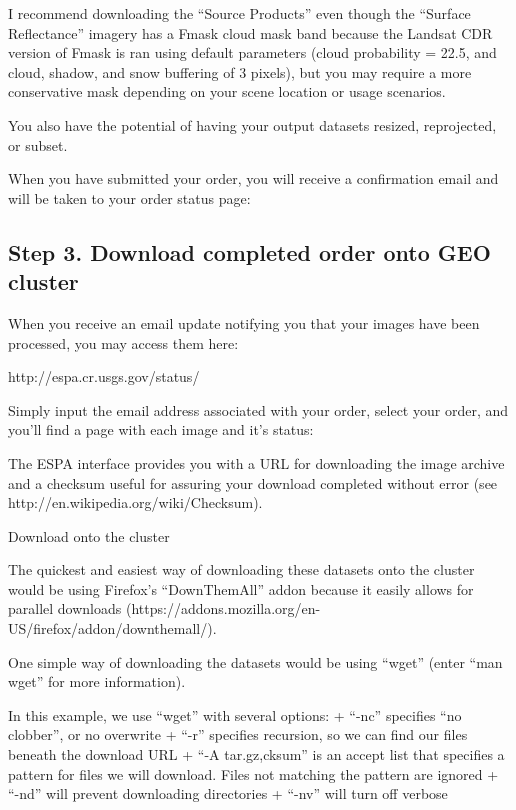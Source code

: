 \documentclass{article}
\begin{document}
I recommend downloading the ``Source Products'' even though the
``Surface Reflectance'' imagery has a Fmask cloud mask band because the
Landsat CDR version of Fmask is ran using default parameters (cloud
probability = 22.5, and cloud, shadow, and snow buffering of 3 pixels),
but you may require a more conservative mask depending on your scene
location or usage scenarios.

You also have the potential of having your output datasets resized,
reprojected, or subset.

When you have submitted your order, you will receive a confirmation
email and will be taken to your order status page:

    \subsection{Step 3. Download completed order onto GEO cluster}

When you receive an email update notifying you that your images have
been processed, you may access them here:

http://espa.cr.usgs.gov/status/

Simply input the email address associated with your order, select your
order, and you'll find a page with each image and it's status:

The ESPA interface provides you with a URL for downloading the image
archive and a checksum useful for assuring your download completed
without error (see http://en.wikipedia.org/wiki/Checksum).

Download onto the cluster

The quickest and easiest way of downloading these datasets onto the
cluster would be using Firefox's ``DownThemAll'' addon because it easily
allows for parallel downloads
(https://addons.mozilla.org/en-US/firefox/addon/downthemall/).

One simple way of downloading the datasets would be using ``wget''
(enter ``man wget'' for more information).

In this example, we use ``wget'' with several options: + ``-nc''
specifies ``no clobber'', or no overwrite + ``-r'' specifies recursion,
so we can find our files beneath the download URL + ``-A tar.gz,cksum''
is an accept list that specifies a pattern for files we will download.
Files not matching the pattern are ignored + ``-nd'' will prevent
downloading directories + ``-nv'' will turn off verbose
\end{document}

